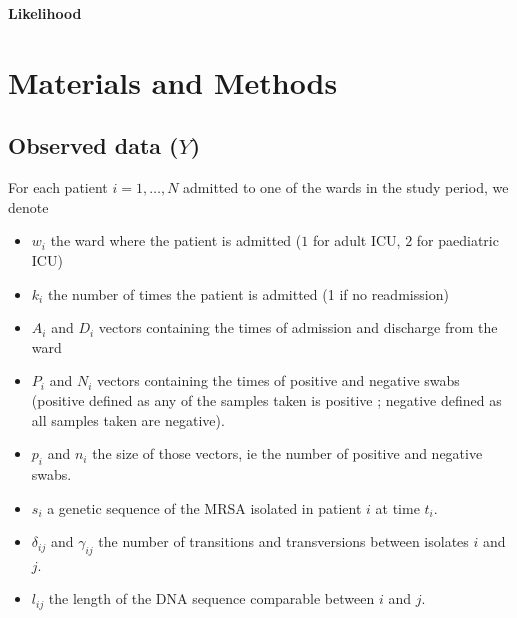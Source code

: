 \documentclass[10pt]{article}
\begin{document}
{\Large
\textbf{Likelihood}
}
\\
\section*{Materials and Methods}

\subsection*{Observed data ($Y$)}

For each patient $i=1,\ldots,N$ admitted to one of the wards in the study period, we denote 
\begin{itemize}
	\item $w_i$ the ward where the patient is admitted ($1$ for adult ICU, $2$ for paediatric ICU)
	\item $k_i$ the number of times the patient is admitted (1 if no readmission)
	\item $A_i$ and $D_i$ vectors containing the times of admission and discharge from the ward
	\item $P_i$ and $N_i$ vectors containing the times of positive and negative swabs (positive defined as any of the samples taken is positive ; negative defined as all samples taken are negative).
	\item $p_i$ and $n_i$ the size of those vectors, ie the number of positive and negative swabs.
	\item $s_i$ a genetic sequence of the MRSA isolated in patient $i$ at time $t_i$.
 	\item $\delta_{ij}$ and $\gamma_{ij}$ the number of transitions and transversions between isolates $i$ and $j$.
	\item $l_{ij}$ the length of the DNA sequence comparable between $i$ and $j$.
\end{itemize}
\end{document}
